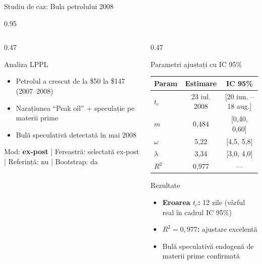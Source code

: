 \documentclass[9pt, aspectratio=169, t]{beamer}
\begin{document}
\begin{frame}{Studiu de caz: Bula petrolului 2008}
\begin{cminipage}{0.95\textwidth}
{\begin{columns}[T]
\begin{column}{0.47\textwidth}
            \begin{exampleblock}{Analiza LPPL}
                \begin{itemize}\setlength{\itemsep}{0pt}
                    \item Petrolul a crescut de la \$50 la \$147 (2007--2008)
                    \item Narațiunea ``Peak oil'' + speculație pe materii prime
                    \item Bulă speculativă detectată în mai 2008
                \end{itemize}
            \end{exampleblock}
            \vspace{-2mm}
            {\scriptsize\textcolor{MediumGray}{Mod: \textbf{ex-post} | Fereastră: selectată ex-post | Referință: nu | Bootstrap: da}}
        \end{column}
        \begin{column}{0.47\textwidth}
            \begin{alertblock}{Parametri ajustați cu IC 95\%}
                \begin{center}
                    \begin{tabular}{lcc}
                        \toprule
                        \textbf{Param} & \textbf{Estimare} & \textbf{IC 95\%} \\
                        \midrule
                        $t_c$ & 23 iul. 2008 & [20 iun. -- 18 aug.] \\
                        $m$ & 0,484 & [0,40, 0,60] \\
                        $\omega$ & 5,22 & [4,5, 5,8] \\
                        $\lambda$ & 3,34 & [3,0, 4,0] \\
                        $R^2$ & 0,977 & --- \\
                        \bottomrule
                    \end{tabular}
                \end{center}
            \end{alertblock}

            \begin{exampleblock}{Rezultate}
                \begin{itemize}\setlength{\itemsep}{0pt}
                    \item \textbf{Eroarea $t_c$:} 12 zile (vârful real în cadrul IC 95\%)
                    \item \textbf{$R^2 = 0{,}977$:} ajustare excelentă
                    \item Bulă speculativă endogenă de materii prime confirmată
                \end{itemize}
            \end{exampleblock}
        \end{column}
    \end{columns}
    }
    \end{cminipage}
\end{frame}
\end{document}
